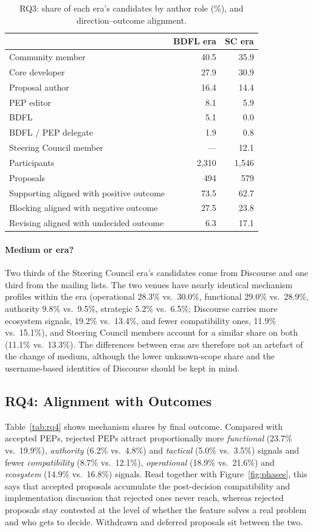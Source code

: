 \documentclass[sigconf,screen]{acmart}
\begin{document}
\begin{table}[t]
\caption{RQ3: share of each era's candidates by author role (\%), and direction--outcome alignment.}
\label{tab:rq3roles}
\begin{tabular}{lrr}
\toprule
 & BDFL era & SC era \\
\midrule
Community member & 40.5 & 35.9 \\
Core developer & 27.9 & 30.9 \\
Proposal author & 16.4 & 14.4 \\
PEP editor & 8.1 & 5.9 \\
BDFL & 5.1 & 0.0 \\
BDFL / PEP delegate & 1.9 & 0.8 \\
Steering Council member & --- & 12.1 \\
\midrule
Participants & 2,310 & 1,546 \\
Proposals & 494 & 579 \\
Supporting aligned with positive outcome & 73.5 & 62.7 \\
Blocking aligned with negative outcome & 27.5 & 23.8 \\
Revising aligned with undecided outcome & 6.3 & 17.1 \\
\bottomrule
\end{tabular}
\end{table}

\paragraph{Medium or era?} Two thirds of the Steering Council era's candidates come from Discourse and one third from the mailing lists. The two venues have nearly identical mechanism profiles within the era (operational 28.3\% vs.\ 30.0\%, functional 29.0\% vs.\ 28.9\%, authority 9.8\% vs.\ 9.5\%, strategic 5.2\% vs.\ 6.5\%; Discourse carries more ecosystem signals, 19.2\% vs.\ 13.4\%, and fewer compatibility ones, 11.9\% vs.\ 15.1\%), and Steering Council members account for a similar share on both (11.1\% vs.\ 13.3\%). The differences between eras are therefore not an artefact of the change of medium, although the lower unknown-scope share and the username-based identities of Discourse should be kept in mind.

\subsection{RQ4: Alignment with Outcomes}

Table~\ref{tab:rq4} shows mechanism shares by final outcome. Compared with accepted PEPs, rejected PEPs attract proportionally more \emph{functional} (23.7\% vs.\ 19.9\%), \emph{authority} (6.2\% vs.\ 4.8\%) and \emph{tactical} (5.0\% vs.\ 3.5\%) signals and fewer \emph{compatibility} (8.7\% vs.\ 12.1\%), \emph{operational} (18.9\% vs.\ 21.6\%) and \emph{ecosystem} (14.9\% vs.\ 16.8\%) signals. Read together with Figure~\ref{fig:phases}, this says that accepted proposals accumulate the post-decision compatibility and implementation discussion that rejected ones never reach, whereas rejected proposals stay contested at the level of whether the feature solves a real problem and who gets to decide. Withdrawn and deferred proposals sit between the two.
\end{document}
